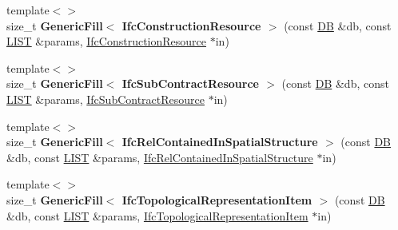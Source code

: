 \begin{DoxyCompactItemize}
\item 
\hypertarget{namespace_assimp_1_1_s_t_e_p_a993ea094af08c4609e6619bb59ac6364}{{\footnotesize template$<$$>$ }\\size\+\_\+t {\bfseries Generic\+Fill$<$ Ifc\+Construction\+Resource $>$} (const \hyperlink{class_assimp_1_1_s_t_e_p_1_1_d_b}{D\+B} \&db, const \hyperlink{class_assimp_1_1_s_t_e_p_1_1_e_x_p_r_e_s_s_1_1_l_i_s_t}{L\+I\+S\+T} \&params, \hyperlink{struct_assimp_1_1_i_f_c_1_1_ifc_construction_resource}{Ifc\+Construction\+Resource} $\ast$in)}\label{namespace_assimp_1_1_s_t_e_p_a993ea094af08c4609e6619bb59ac6364}

\item 
\hypertarget{namespace_assimp_1_1_s_t_e_p_ad76961716a1b522e6743a4c162f4e0b8}{{\footnotesize template$<$$>$ }\\size\+\_\+t {\bfseries Generic\+Fill$<$ Ifc\+Sub\+Contract\+Resource $>$} (const \hyperlink{class_assimp_1_1_s_t_e_p_1_1_d_b}{D\+B} \&db, const \hyperlink{class_assimp_1_1_s_t_e_p_1_1_e_x_p_r_e_s_s_1_1_l_i_s_t}{L\+I\+S\+T} \&params, \hyperlink{struct_assimp_1_1_i_f_c_1_1_ifc_sub_contract_resource}{Ifc\+Sub\+Contract\+Resource} $\ast$in)}\label{namespace_assimp_1_1_s_t_e_p_ad76961716a1b522e6743a4c162f4e0b8}

\item 
\hypertarget{namespace_assimp_1_1_s_t_e_p_a2496c8055a68c2812c35ff9b7826abf5}{{\footnotesize template$<$$>$ }\\size\+\_\+t {\bfseries Generic\+Fill$<$ Ifc\+Rel\+Contained\+In\+Spatial\+Structure $>$} (const \hyperlink{class_assimp_1_1_s_t_e_p_1_1_d_b}{D\+B} \&db, const \hyperlink{class_assimp_1_1_s_t_e_p_1_1_e_x_p_r_e_s_s_1_1_l_i_s_t}{L\+I\+S\+T} \&params, \hyperlink{struct_assimp_1_1_i_f_c_1_1_ifc_rel_contained_in_spatial_structure}{Ifc\+Rel\+Contained\+In\+Spatial\+Structure} $\ast$in)}\label{namespace_assimp_1_1_s_t_e_p_a2496c8055a68c2812c35ff9b7826abf5}

\item 
\hypertarget{namespace_assimp_1_1_s_t_e_p_a2a230e1663335415cccf455a9f95ec8b}{{\footnotesize template$<$$>$ }\\size\+\_\+t {\bfseries Generic\+Fill$<$ Ifc\+Topological\+Representation\+Item $>$} (const \hyperlink{class_assimp_1_1_s_t_e_p_1_1_d_b}{D\+B} \&db, const \hyperlink{class_assimp_1_1_s_t_e_p_1_1_e_x_p_r_e_s_s_1_1_l_i_s_t}{L\+I\+S\+T} \&params, \hyperlink{struct_assimp_1_1_i_f_c_1_1_ifc_topological_representation_item}{Ifc\+Topological\+Representation\+Item} $\ast$in)}\label{namespace_assimp_1_1_s_t_e_p_a2a230e1663335415cccf455a9f95ec8b}


\end{DoxyCompactItemize}
